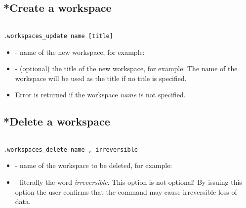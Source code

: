 \subsection{*Create a workspace}

\begin{lstlisting}[style=CommandLineStyle, showlines=true]

.workspaces_update name [title]

\end{lstlisting}

\paramsheader
\begin{itemize}

  \item {} - name of the new workspace, for example:

  \item {} - (optional) the title of the new workspace, for example:
        \newline
        The name of the workspace will be used as the title if no title is
        specified.

\end{itemize}

\errheader
\begin{itemize}
   \item Error  is returned if the workspace \textit{name} is
         not specified.
\end{itemize}


\subsection{*Delete a workspace}

\begin{lstlisting}[style=CommandLineStyle, showlines=true]

.workspaces_delete name , irreversible

\end{lstlisting}

\paramsheader
\begin{itemize}

  \item {} - name of the workspace to be deleted, for example:

  \item {} - literally the word \textit{irreversible}. This
        option is not optional! By issuing this option the user confirms that
        the command may cause irreversible loss of data.

\end{itemize}

